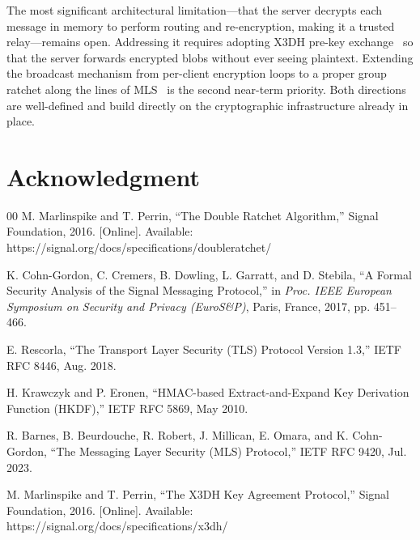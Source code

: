 \documentclass[conference]{IEEEtran}
\begin{document}
The most significant architectural limitation—that the server decrypts each message in
memory to perform routing and re-encryption, making it a trusted relay—remains open.
Addressing it requires adopting X3DH pre-key exchange~\cite{b6} so that the server
forwards encrypted blobs without ever seeing plaintext. Extending the broadcast
mechanism from per-client encryption loops to a proper group ratchet along the lines
of MLS~\cite{b5} is the second near-term priority. Both directions are well-defined
and build directly on the cryptographic infrastructure already in place.

\section*{Acknowledgment}

\begin{thebibliography}{00}
 M. Marlinspike and T. Perrin, ``The Double Ratchet Algorithm,''
    Signal Foundation, 2016. [Online]. Available: https://signal.org/docs/specifications/doubleratchet/

 K. Cohn-Gordon, C. Cremers, B. Dowling, L. Garratt, and D. Stebila,
    ``A Formal Security Analysis of the Signal Messaging Protocol,''
    in \textit{Proc. IEEE European Symposium on Security and Privacy (EuroS\&P)},
    Paris, France, 2017, pp. 451--466.

 E. Rescorla, ``The Transport Layer Security (TLS) Protocol Version 1.3,''
    IETF RFC 8446, Aug. 2018.

 H. Krawczyk and P. Eronen, ``HMAC-based Extract-and-Expand Key
    Derivation Function (HKDF),'' IETF RFC 5869, May 2010.

 R. Barnes, B. Beurdouche, R. Robert, J. Millican, E. Omara, and K. Cohn-Gordon,
    ``The Messaging Layer Security (MLS) Protocol,''
    IETF RFC 9420, Jul. 2023.

 M. Marlinspike and T. Perrin, ``The X3DH Key Agreement Protocol,''
    Signal Foundation, 2016. [Online]. Available: https://signal.org/docs/specifications/x3dh/
\end{thebibliography}
\end{document}
